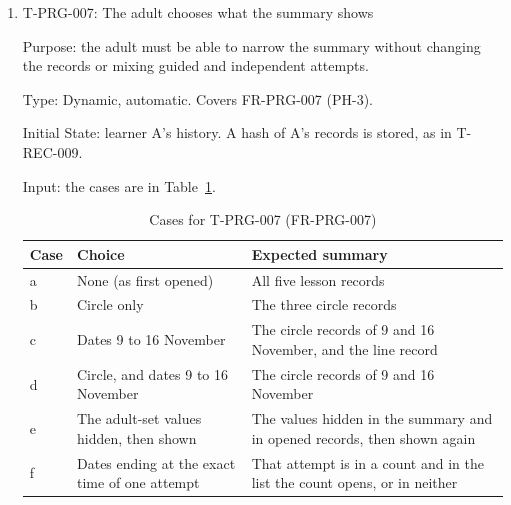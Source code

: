 \documentclass[12pt, titlepage]{article}
\newcommand{\testitem}[1]{\item #1\par\nopagebreak}
\begin{document}
\begin{enumerate}
Output: each view shows the lesson, stage, outcome (or the interrupted mark
in (c), with no outcome), date and time, each difficulty with its correction
mark, and the adult-set values in use. In (d), the two views show the values
before and after the change. The strokes drawn in each view equal the
recorded strokes: the same number, order and boundaries, and every point
within \texttt{COORD\_TOL}. In (e), the single-point stroke is shown.

Test Case Derivation: the fit criterion of FR-PRG-006 lists the values; each
case adds one that is easy to drop: a correction mark, an interrupted
attempt with no outcome, values that differ between attempts, and a
one-point stroke (BR-004).

How test will be performed: a Playwright script reads the fields and the
stroke list the view draws, and compares them with the record in the test
database.

\testitem{T-PRG-007: The adult chooses what the summary shows}

Purpose: the adult must be able to narrow the summary without changing the
records or mixing guided and independent attempts.

Type: Dynamic, automatic. Covers FR-PRG-007 (PH-3).

Initial State: learner A's history. A hash of A's records is stored, as in
T-REC-009.

Input: the cases are in Table~\ref{tab:t-prg-007}.

\begin{table}[htbp]
\centering\small
\caption{Cases for T-PRG-007 (FR-PRG-007)}
\label{tab:t-prg-007}
\begin{tabularx}{\textwidth}{@{}l >{\raggedright\arraybackslash}X
  >{\raggedright\arraybackslash}X@{}}
\toprule
\textbf{Case} & \textbf{Choice} & \textbf{Expected summary}\\
\midrule
a & None (as first opened) & All five lesson records\\
b & Circle only & The three circle records\\
c & Dates 9 to 16 November & The circle records of 9 and 16 November, and
the line record\\
d & Circle, and dates 9 to 16 November & The circle records of 9 and 16
November\\
e & The adult-set values hidden, then shown & The values hidden in the
summary and in opened records, then shown again\\
f & Dates ending at the exact time of one attempt & That attempt is in a
count and in the list the count opens, or in neither\\
\bottomrule
\end{tabularx}
\end{table}


\end{enumerate}
\end{document}
